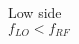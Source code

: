 \documentclass[preview]{standalone}
\begin{document}
\begin{center}
Low side \\ $f_{LO} < f_{RF}$
\end{center}
\end{document}
